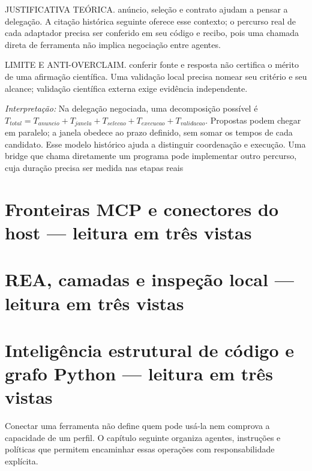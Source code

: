 \begin{descricao}
JUSTIFICATIVA TEÓRICA. anúncio, seleção e contrato ajudam a pensar a delegação.
A citação histórica seguinte oferece esse contexto; o percurso real de cada
adaptador precisa ser conferido em seu código e recibo, pois uma chamada direta
de ferramenta não implica negociação entre agentes.
\end{descricao}

\begin{aviso}
LIMITE E ANTI-OVERCLAIM. conferir fonte e resposta não certifica o mérito de uma
afirmação científica. Uma validação local precisa nomear seu critério e seu
alcance; validação científica externa exige evidência independente.
\end{aviso}

\noindent\textit{Interpretação:} Na delegação negociada, uma decomposição possível é
$T_{total}=T_{anuncio}+T_{janela}+T_{selecao}+T_{execucao}+T_{validacao}$.
Propostas podem chegar em paralelo; a janela obedece ao prazo definido, sem
somar os tempos de cada candidato. Esse modelo histórico ajuda a distinguir
coordenação e execução. Uma bridge que chama diretamente um programa pode
implementar outro percurso, cuja duração precisa ser medida nas etapas reais


\clearpage\section{Fronteiras MCP e conectores do host — leitura em três vistas}\label{arch:AR12}



\clearpage\section{REA, camadas e inspeção local — leitura em três vistas}\label{arch:AR13}



\clearpage\section{Inteligência estrutural de código e grafo Python — leitura em três vistas}\label{arch:AR14}





Conectar uma ferramenta não define quem pode usá-la nem comprova a capacidade de um perfil. O capítulo seguinte organiza agentes, instruções e políticas que permitem encaminhar essas operações com responsabilidade explícita.
